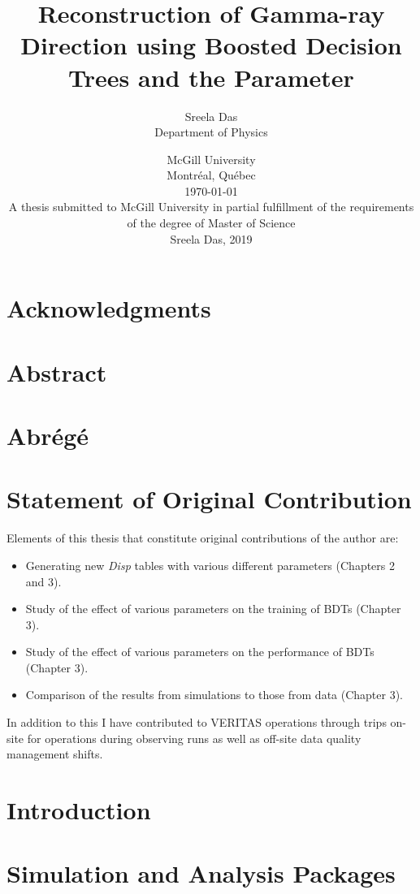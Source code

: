 \documentclass[openany, oneside, 12pt]{book}
\title{\Huge Reconstruction of Gamma-ray Direction using Boosted Decision Trees and the \disp Parameter \vspace{14pt}}
\author{\Large Sreela Das \\ \large Department of Physics \vspace{33pt}}
\date{\large McGill University \\ \large Montr\'eal, Qu\'ebec \\ \large \today \vspace{33pt}\\
  A thesis submitted to McGill University in partial fulfillment of the requirements of the degree of Master of Science\\ \vspace{30pt}\textcopyright \hspace{5pt}Sreela Das, 2019}
\newcommand{\disp}{\textit{Disp }}
\begin{document}
\frontmatter
\renewcommand{\chaptermark}[1]{\markboth{\MakeUppercase{\chaptername\ \thechapter.\ #1}}{}}
\maketitle
\clearpage
{}
\raggedright
\chapter{Acknowledgments}

\clearpage
\chapter{Abstract}

\clearpage
\chapter{Abr\'eg\'e}

\chapter{Statement of Original Contribution}
Elements of this thesis that constitute original contributions of the author are:
\begin{itemize}
\item Generating new \disp tables with various different parameters (Chapters 2 and 3).
\item Study of the effect of various parameters on the training of BDTs (Chapter 3).
\item Study of the effect of various parameters on the performance of BDTs (Chapter 3).
\item Comparison of the results from simulations to those from data (Chapter 3).
\end{itemize}
In addition to this I have contributed to VERITAS operations through trips on-site for operations during observing runs as well as off-site data quality management shifts. 

\clearpage
\tableofcontents
\listoffigures
\mainmatter
\raggedbottom

\setlength\parindent{24pt}
\setlength\parskip{10pt}
\pagestyle{plain}

\chapter{Introduction}


\chapter{Simulation and Analysis Packages}

\end{document}
